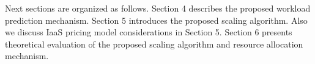 Next sections are organized as follows. Section 4 describes the proposed workload prediction mechanism. Section 5 introduces the proposed scaling algorithm. Also we discuss IaaS pricing model considerations in Section 5. Section 6 presents theoretical evaluation of the proposed scaling algorithm and resource allocation mechanism.